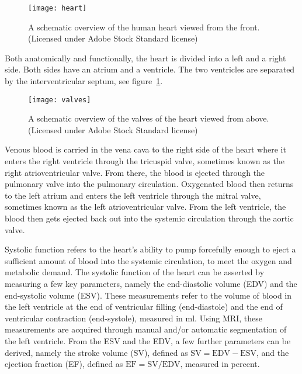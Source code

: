 \begin{figure}[htbp]
\centering
\texttt{[image: heart]}
\caption{A schematic overview of the human heart viewed from the front. (Licensed under Adobe Stock Standard license)}
\label{fig:heart}
\end{figure}
Both anatomically and functionally, the heart is divided into a left and a right side. Both sides have an atrium and a ventricle. The two ventricles are separated by the interventricular septum, see figure~\ref{fig:heart}.
\begin{figure}[tbp]
\centering
\texttt{[image: valves]}
\caption{A schematic overview of the valves of the heart viewed from above. (Licensed under Adobe Stock Standard license)}
\label{fig:valves}
\end{figure}
Venous blood is carried in the vena cava to the right side of the heart where it enters the right ventricle through the tricuspid valve, sometimes known as the right atrioventricular valve. From there, the blood is ejected through the pulmonary valve into the pulmonary circulation. Oxygenated blood then returns to the left atrium and enters the left ventricle through the mitral valve, sometimes known as the left atrioventricular valve. From the left ventricle, the blood then gets ejected back out into the systemic circulation through the aortic valve. 

Systolic function refers to the heart's ability to pump forcefully enough to eject a sufficient amount of blood into the systemic circulation, to meet the oxygen and metabolic demand. The systolic function of the heart can be asserted by measuring a few key parameters, namely the end-diastolic volume (EDV) and the end-systolic volume (ESV). These measurements refer to the volume of blood in the left ventricle at the end of ventricular filling (end-diastole) and the end of ventricular contraction (end-systole), measured in ml. Using MRI, these measurements are acquired through manual and/or automatic segmentation of the left ventricle. From the ESV and the EDV, a few further parameters can be derived, namely the stroke volume (SV),  defined as $\textrm{SV} = \textrm{EDV} - \textrm{ESV}$, and the ejection fraction (EF), defined as  $\textrm{EF} = \textrm{SV}/\textrm{EDV,}$ measured in percent.

